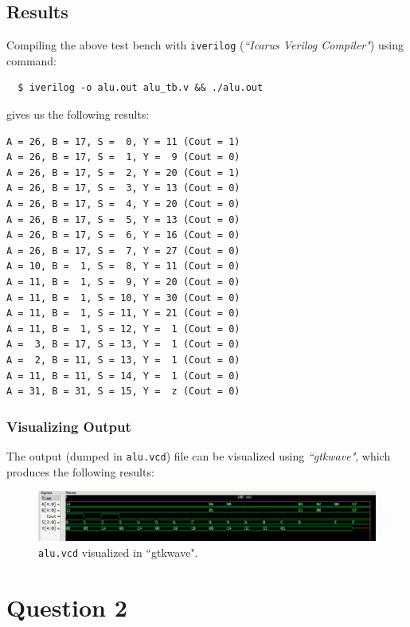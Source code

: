 \documentclass[12pt]{article}
\begin{document}
\newpage

\subsection{Results}

Compiling the above test bench with \texttt{iverilog} (\textit{``Icarus Verilog
Compiler"}) using command:

\begin{verbatim}
  $ iverilog -o alu.out alu_tb.v && ./alu.out
\end{verbatim}

gives us the following results:

\begin{verbatim}
A = 26, B = 17, S =  0, Y = 11 (Cout = 1)
A = 26, B = 17, S =  1, Y =  9 (Cout = 0)
A = 26, B = 17, S =  2, Y = 20 (Cout = 1)
A = 26, B = 17, S =  3, Y = 13 (Cout = 0)
A = 26, B = 17, S =  4, Y = 20 (Cout = 0)
A = 26, B = 17, S =  5, Y = 13 (Cout = 0)
A = 26, B = 17, S =  6, Y = 16 (Cout = 0)
A = 26, B = 17, S =  7, Y = 27 (Cout = 0)
A = 10, B =  1, S =  8, Y = 11 (Cout = 0)
A = 11, B =  1, S =  9, Y = 20 (Cout = 0)
A = 11, B =  1, S = 10, Y = 30 (Cout = 0)
A = 11, B =  1, S = 11, Y = 21 (Cout = 0)
A = 11, B =  1, S = 12, Y =  1 (Cout = 0)
A =  3, B = 17, S = 13, Y =  1 (Cout = 0)
A =  2, B = 11, S = 13, Y =  1 (Cout = 0)
A = 11, B = 11, S = 14, Y =  1 (Cout = 0)
A = 31, B = 31, S = 15, Y =  z (Cout = 0)
\end{verbatim}

\subsubsection{Visualizing Output}
The output (dumped in \texttt{alu.vcd}) file can be visualized using
\textit{``gtkwave"}, which produces the following results:

\begin{figure}[H]
  \centering
  \includegraphics[width=\columnwidth]{img/alu.png}
  \caption{\texttt{alu.vcd} visualized in ``gtkwave".}
  \label{fig:alu}
\end{figure}

\section{Question 2}
\end{document}
